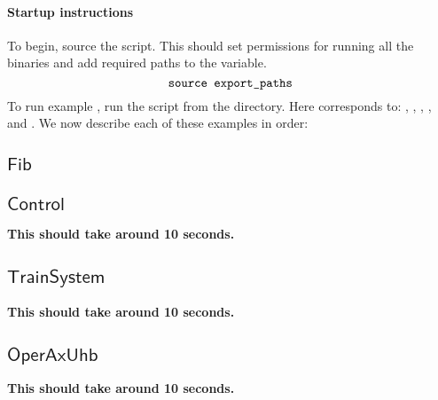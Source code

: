 \documentclass[runningheads]{llncs}
\begin{document}
\paragraph{Startup instructions}
To begin, source the  script. 
This should set permissions for running all the binaries and add required paths to the  variable.
\begin{equation*}
    \texttt{source export\_paths}
\end{equation*}
To run example , 
run the script  
from the  directory.
Here  corresponds to:
, ,
, , and .
We now describe each of these examples in order:

\newcommand{\excommand}[1]{$\mathsf{#1}$}

\subsection{\excommand{Fib}}


\subsection{\excommand{Control}}


\textbf{This should take around 10 seconds.}

\subsection{\excommand{TrainSystem}}


\textbf{This should take around 10 seconds.}


\subsection{\excommand{OperAxUhb}}

\textbf{This should take around 10 seconds.}
\end{document}
